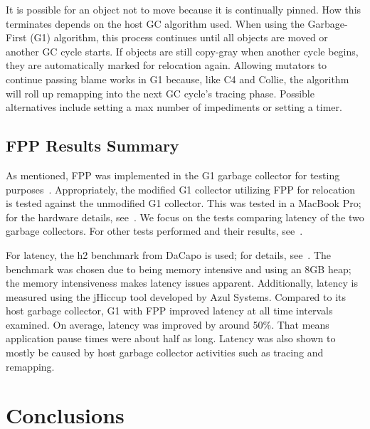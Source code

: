 \documentclass{sig-alternate}
\begin{document}
It is possible for an
object not to move because it is continually pinned. How this terminates 
depends on the host GC algorithm used. When using the Garbage-First (G1) algorithm,
this process continues until all objects are moved or another GC cycle starts.
If objects are still copy-gray when another cycle begins, they are automatically
marked for relocation again. Allowing mutators to continue passing blame works
in G1 because, like C4 and Collie, the algorithm will roll up remapping into the next
GC cycle's tracing phase. Possible alternatives include setting a max number of impediments
or setting a timer.



\subsection{FPP Results Summary}
\label{sec:fppResults}

As mentioned, FPP was implemented in the G1 garbage collector for testing purposes~\cite{Osterlund:FPP}. 
Appropriately, the modified G1 collector utilizing FPP for relocation is tested against the
unmodified G1 collector. This was tested in a MacBook Pro; for the 
hardware details, see~\cite{Osterlund:FPP}. We focus on the tests comparing
latency of the two garbage collectors. For other tests performed and their results, see~\cite{Osterlund:FPP}.

For latency, the h2 benchmark from DaCapo is used; for details, see~\cite{Blackburn:DaCapo}.
The benchmark was chosen due to being memory intensive and using an 8GB heap;
the memory intensiveness makes latency issues apparent.
Additionally, latency is measured using the jHiccup tool developed by Azul Systems.
Compared to its host garbage collector, G1 with FPP improved latency at all time
intervals examined. On average, latency was improved by around 50\%. That means application
pause times were about half as long. Latency was also shown to mostly be caused by 
host garbage collector activities such as tracing and remapping.


\section{Conclusions}
\label{sec:conclusions}
\end{document}
